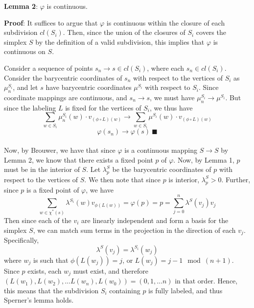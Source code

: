 \documentclass[10pt,letter]{article}
\begin{document}
\textbf{Lemma 2}: $\varphi$ is continuous.

\textbf{Proof}: It suffices to argue that $\varphi$ is continuous within the closure of each subdivision $cl(S_i)$. Then, since the union of the closures of $S_i$ covers the simplex $S$ by the definition of a valid subdivision, this implies that $\varphi$ is continuous on $S$.

Consider a sequence of points $s_n \to s \in cl(S_i)$, where each $s_n \in cl(S_i)$. Consider the barycentric coordinates of $s_n$ with respect to the vertices of $S_i$ as $\mu_n^{S_i}$, and let $s$ have barycentric coordinates $\mu^{S_i}$ with respect to $S_i$. Since coordinate mappings are continuous, and $s_n \to s$, we must have $\mu_n^{S_i} \to \mu^{S_i}$. But since the labeling $L$ is fixed for the vertices of $S_i$, we thus have \[ \sum_{w \in S_i} \mu_n^{S_i}(w) \cdot v_{(\phi\circ L)(w)} \to \sum_{w \in S_i} \mu^{S_i}(w) \cdot v_{(\phi\circ L)(w)} \]  \[ \varphi(s_n) \to \varphi(s) \ \blacksquare\] \\

Now, by Brouwer, we have that since $\varphi$ is a continuous mapping $S \to S$ by Lemma 2, we know that there exists a fixed point $p$ of $\varphi$. Now, by Lemma 1, $p$ must be in the interior of $S$. Let $\lambda^S_p$ be the barycentric coordinates of $p$ with respect to the vertices of $S$. We then note that since $p$ is interior, $\lambda^S_p > 0$. Further, since $p$ is a fixed point of $\varphi$, we have
\[  \sum_{w \in \chi^*(s) } \lambda^{S_i}(w) v_{\phi(L(w))} = \varphi(p) = p = \sum_{j = 0}^n \lambda^S(v_j) v_j \]
Then since each of the $v_i$ are linearly independent and form a basis for the simplex $S$, we can match sum terms in the projection in the direction of each $v_j$. Specifically,
\[ \lambda^S(v_j) = \lambda^{S_i}(w_j)  \]
where $w_j$ is such that $\phi(L(w_j)) = j$, or $L(w_j) = j-1 \mod (n+1)$. Since $p$ exists, each $w_j$ must exist, and therefore $(L(w_1), L(w_2), ... L(w_n), L(w_0)) = (0, 1, ... n)$ in that order. Hence, this means that the subdivision $S_i$ containing $p$ is fully labeled, and thus Sperner's lemma holds.
\end{document}
